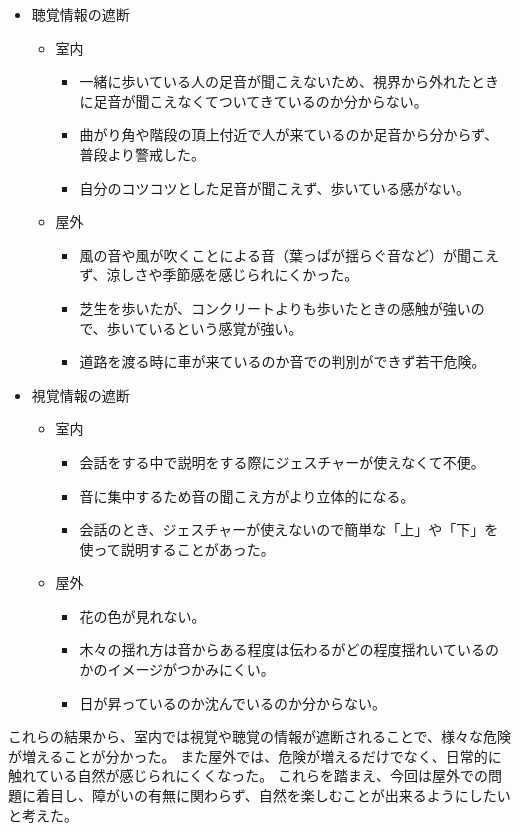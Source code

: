 \begin{itemize}
  \item 聴覚情報の遮断
  \begin{itemize}
    \item 室内
    \begin{itemize}
      \item 一緒に歩いている人の足音が聞こえないため、視界から外れたときに足音が聞こえなくてついてきているのか分からない。
      \item 曲がり角や階段の頂上付近で人が来ているのか足音から分からず、普段より警戒した。
      \item 自分のコツコツとした足音が聞こえず、歩いている感がない。
    \end{itemize}
    \item 屋外
    \begin{itemize}
      \item 風の音や風が吹くことによる音（葉っぱが揺らぐ音など）が聞こえず、涼しさや季節感を感じられにくかった。
      \item 芝生を歩いたが、コンクリートよりも歩いたときの感触が強いので、歩いているという感覚が強い。
      \item 道路を渡る時に車が来ているのか音での判別ができず若干危険。
    \end{itemize}
  \end{itemize}
  \newpage
  \item 視覚情報の遮断
  \begin{itemize}
    \item 室内
    \begin{itemize}
      \item 会話をする中で説明をする際にジェスチャーが使えなくて不便。
      \item 音に集中するため音の聞こえ方がより立体的になる。
      \item 会話のとき、ジェスチャーが使えないので簡単な「上」や「下」を使って説明することがあった。
    \end{itemize}
    \item 屋外
    \begin{itemize}
      \item 花の色が見れない。
      \item 木々の揺れ方は音からある程度は伝わるがどの程度揺れいているのかのイメージがつかみにくい。
      \item 日が昇っているのか沈んでいるのか分からない。
    \end{itemize}
  \end{itemize}
\end{itemize}
これらの結果から、室内では視覚や聴覚の情報が遮断されることで、様々な危険が増えることが分かった。
また屋外では、危険が増えるだけでなく、日常的に触れている自然が感じられにくくなった。
これらを踏まえ、今回は屋外での問題に着目し、障がいの有無に関わらず、自然を楽しむことが出来るようにしたいと考えた。

